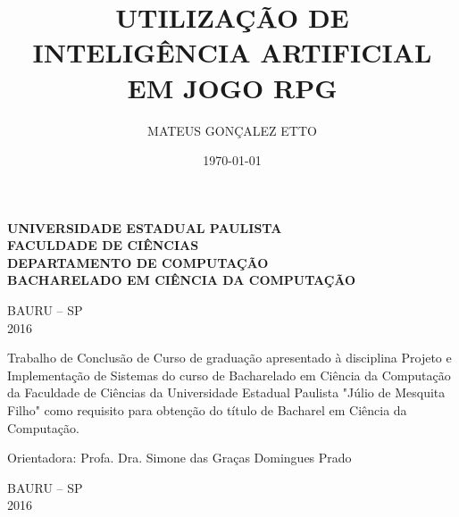 \documentclass[
	12pt,					%
	openright,				%
	oneside,				%
	a4paper,				%
	bibjustif,				%
	chapter=TITLE,			%
	english,				%
	brazil,					%
	]{abntex2}
\author{MATEUS GONÇALEZ ETTO}
\title{UTILIZAÇÃO DE INTELIGÊNCIA ARTIFICIAL EM JOGO RPG}
\date{\today}
\begin{document}

\thispagestyle{empty} %
\begin{center}
\makeatletter
	\textbf{UNIVERSIDADE ESTADUAL PAULISTA}\\
	\textbf{FACULDADE DE CIÊNCIAS}\\
	\textbf{DEPARTAMENTO DE COMPUTAÇÃO}\\
	\textbf{BACHARELADO EM CIÊNCIA DA COMPUTAÇÃO}\\

	\vspace{4.5cm} %
	\textbf{\@author}

	\vspace{4.5cm} %
	\textbf{\large \@title}
	
	\vspace*{\fill} %
	BAURU – SP\\
	2016
\makeatother
\end{center}

\newpage %
\thispagestyle{empty} %
\begin{center}
\makeatletter
	\textbf{\@author}

	\vspace{4.5cm} %
	\textbf{\large \@title}
\makeatother
\end{center}

\begin{adjustwidth}{7cm}{0cm}
	\vspace{1.5cm}
	Trabalho de Conclusão de Curso de graduação apresentado à disciplina Projeto e Implementação de Sistemas do curso de Bacharelado em Ciência da Computação da Faculdade de Ciências da Universidade Estadual Paulista "Júlio de Mesquita Filho"{} como requisito para obtenção do título de Bacharel em Ciência da Computação.
	
	\vspace{1.0cm} %
	\noindent
	Orientadora: Profa. Dra. Simone das Graças Domingues Prado
\end{adjustwidth}

\begin{center}
	\vspace*{\fill} %
	BAURU – SP\\
	2016
\end{center}
\end{document}
